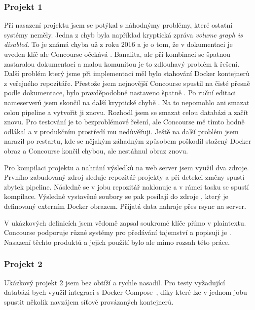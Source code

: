 
        \subsubsection{Projekt 1}
            Při nasazení projektu jsem se potýkal s náhodnýmy problémy, které ostatní \CI systémy neměly. Jedna z chyb byla například kryptická zpráva \textit{volume graph is disabled}. To je známá chyba už z roku 2016 a je o tom, že v dokumentaci je uveden klíč  ale Concourse očekává  \cite{concourse-issue-402}. Banalita, ale při kombinaci se špatnou zastaralou dokumentací a malou komunitou je to zdlouhavý problém k řešení. Další problém který jsme při implementaci měl bylo stahování Docker kontejnerů z veřejného repozitáře. Přestože jsem nejnovější Concourse spustil na čisté  přesně podle dokumentace, bylo pravděpodobně nastaveno špatně . Po ruční editaci nameserverů jsem skončil na další kryptické chybě . Na to nepomohlo ani smazat celou pipeline a vytvořit ji znovu. Rozhodl jsem se smazat celou databázi a začít znovu. Pro testování je to bezproblémové řešení, ale Concourse mě tímto hodně odlákal a v produkčním prostředí mu nedůvěřuji. Ještě na další problém jsem narazil po restartu, kde se nějakým záhadným způsobem poškodil stažený Docker obraz a Concourse končil chybou, ale nestáhnul obraz znovu.

            Pro kompilaci projektu a nahrání výsledků na web server jsem využil dva zdroje. Prvního zabudovaný zdroj  sleduje repozitář projekty a při detekci změny spustí zbytek pipeline. Následně se v jobu repozitář naklonuje a v rámci tasku se spustí kompilace. Výsledné vystavěné soubory se pak posílají do zdroje , který je definovaný externím Docker obrazem. Přijatá data nahraje přes rsync na server.

            V ukázkových definicích jsem vědomě zapsal soukromé klíče přímo v plaintextu. Concourse podporuje různé systémy pro předávání tajemství a popisuji je . Nasazení těchto produktů a jejich použití bylo ale mimo rozsah této práce.

        \subsubsection{Projekt 2}
            Ukázkový projekt 2 jsem bez obtíží a rychle nasadil. Pro testy vyžadující databázi bych využil integraci s Docker Compose~\cite{concourse-compose}, díky které lze v jednom jobu spustit několik navzájem síťově provázaných kontejnerů.

